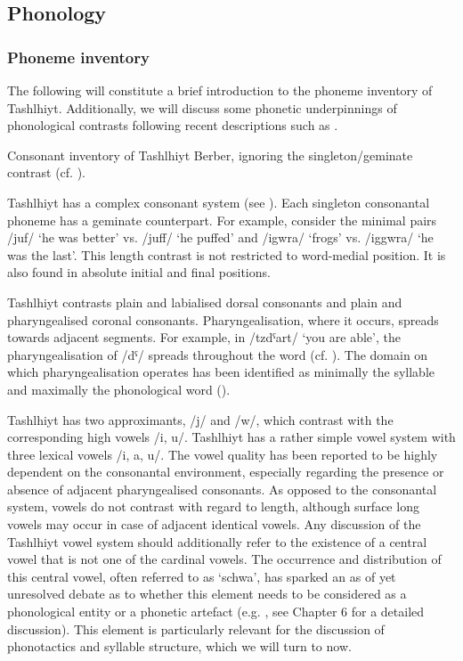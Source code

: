 \subsection{Phonology}\label{sec:3.4.2}
\subsubsection{Phoneme inventory}
The following will constitute a brief introduction to the phoneme inventory of Tashlhiyt. Additionally, we will discuss some phonetic underpinnings of phonological contrasts following recent descriptions such as \citet{Ridouane2014}. 
 
\begin{table}
 
\caption{Consonant inventory of Tashlhiyt Berber, ignoring the singleton/geminate contrast (cf. \citealt{Ridouane2014}).}
   \label{tab:consonants}
   \end{table}

   
Tashlhiyt has a complex consonant system (see ). Each singleton consonantal phoneme has a geminate counterpart. For example, consider the minimal pairs /juf/ ‘he was better’ vs. /juff/ ‘he puffed’ and /igwra/ ‘frogs’ vs. /iggwra/ ‘he was the last’. This length contrast is not restricted to word-medial position. It is also found in absolute initial and final positions.

Tashlhiyt contrasts plain and labialised dorsal consonants and plain and pharyngealised coronal consonants. Pharyngealisation, where it occurs, spreads towards adjacent segments. For example, in /tzdˤart/ ‘you are able’, the pharyngealisation of /dˤ/ spreads throughout the word (cf. \citealt{Ridouane2003}). The domain on which pharyngealisation operates has been identified as minimally the syllable and maximally the phonological word (\citealt{Elmedlaoui1995,DE2002}).

Tashlhiyt has two approximants, /j/ and /w/, which contrast with the corresponding high vowels /i, u/. Tashlhiyt has a rather simple vowel system with three lexical vowels /i, a, u/. The vowel quality has been reported to be highly dependent on the consonantal environment, especially regarding the presence or absence of adjacent pharyngealised consonants. As opposed to the consonantal system, vowels do not contrast with regard to length, although surface long vowels may occur in case of adjacent identical vowels. Any discussion of the Tashlhiyt vowel system should additionally refer to the existence of a central vowel that is not one of the cardinal vowels. The occurrence and distribution of this central vowel, often referred to as ‘schwa’, has sparked an as of yet unresolved debate as to whether this element needs to be considered as a phonological entity or a phonetic artefact (e.g. \citealt{Coleman1996,Coleman1999,Coleman2001,DE2002,Ridouane2008}, see Chapter 6 for a detailed discussion). This element is particularly relevant for the discussion of phonotactics and syllable structure, which we will turn to now.

